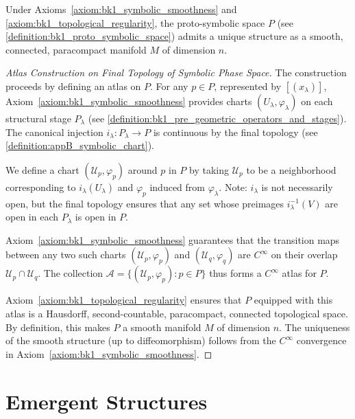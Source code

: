 \begin{theorem}
\label{theorem:bk1_manifold_emergence}
Under Axioms~\ref{axiom:bk1_symbolic_smoothness} and \ref{axiom:bk1_topological_regularity}, the proto-symbolic space $P$ (see \ref{definition:bk1_proto_symbolic_space}) admits a unique structure as a smooth, connected, paracompact manifold $M$ of dimension $n$.

\begin{proof}[Atlas Construction on Final Topology of Symbolic Phase Space]
\label{proof:bk1_atlas_final_topology_phase_space}
The construction proceeds by defining an atlas on $P$. For any $p \in P$, represented by $[(x_\lambda)]$, Axiom~\ref{axiom:bk1_symbolic_smoothness} provides charts $(U_\lambda, \varphi_\lambda)$ on each structural stage $P_\lambda$ (see \ref{definition:bk1_pre_geometric_operators_and_stages}). The canonical injection $i_\lambda: P_\lambda \to P$ is continuous by the final topology (see \ref{definition:appB_symbolic_chart}).

We define a chart $(\mathcal{U}_p, \varphi_p)$ around $p$ in $P$ by taking $\mathcal{U}_p$ to be a neighborhood corresponding to $i_\lambda(U_\lambda)$ and $\varphi_p$ induced from $\varphi_\lambda$. Note: $i_\lambda$ is not necessarily open, but the final topology ensures that any set whose preimages $i_\lambda^{-1}(V)$ are open in each $P_\lambda$ is open in $P$.

Axiom~\ref{axiom:bk1_symbolic_smoothness} guarantees that the transition maps between any two such charts $(\mathcal{U}_p, \varphi_p)$ and $(\mathcal{U}_q, \varphi_q)$ are $C^\infty$ on their overlap $\mathcal{U}_p \cap \mathcal{U}_q$. The collection $\mathcal{A} = \{(\mathcal{U}_p, \varphi_p) : p \in P\}$ thus forms a $C^\infty$ atlas for $P$.

Axiom~\ref{axiom:bk1_topological_regularity} ensures that $P$ equipped with this atlas is a Hausdorff, second-countable, paracompact, connected topological space. By definition, this makes $P$ a smooth manifold $M$ of dimension $n$. The uniqueness of the smooth structure (up to diffeomorphism) follows from the $C^\infty$ convergence in Axiom~\ref{axiom:bk1_symbolic_smoothness}.
\end{proof}
\end{theorem}

\section{Emergent Structures}
\label{subsec:bk1_emergent_structures}

